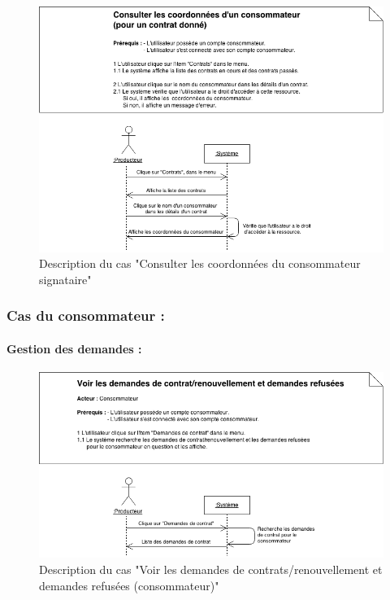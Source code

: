 \documentclass[12pt]{report}
\begin{document}
\begin{figure}[!H]
\centering
\includegraphics[width=1.\textwidth]{./ressources/desc_UC_coo_conso_contrats.png}
\caption{Description du cas "Consulter les coordonnées du consommateur signataire"}
\end{figure}
\clearpage



\subsubsection{Cas du consommateur :}
\paragraph*{Gestion des demandes :}

\begin{figure}[!H]
\centering
\includegraphics[width=1.\textwidth]{./ressources/desc_UC_voir_demandes_cons.png}
\caption{Description du cas "Voir les demandes de contrats/renouvellement et demandes refusées (consommateur)"}
\end{figure}
\clearpage
\end{document}
